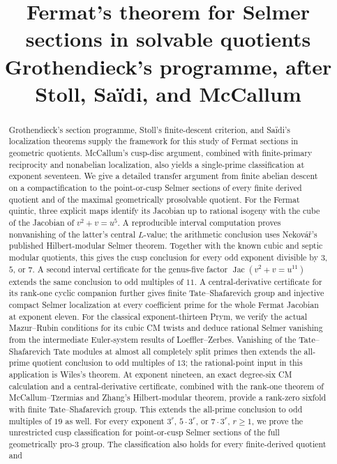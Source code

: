 \documentclass[11pt]{article}
\title{Fermat's theorem for Selmer sections in solvable quotients\\
\large Grothendieck's programme, after Stoll, Sa\"idi, and McCallum}
\author{}
\date{}
\theoremstyle{definition}
\begin{document}
\maketitle
\begin{abstract}
Grothendieck's section programme, Stoll's finite-descent criterion, and
Sa\"idi's localization theorems supply the framework for this study of
Fermat sections in geometric quotients. McCallum's cusp-disc argument,
combined with finite-primary reciprocity and nonabelian localization,
also yields a single-prime classification at exponent seventeen. We give a detailed transfer
argument from finite abelian descent on a compactification to the
point-or-cusp Selmer sections of every finite derived quotient and of the
maximal geometrically prosolvable quotient. For the Fermat quintic, three
explicit maps identify its Jacobian up to rational isogeny with the cube
of the Jacobian of $v^2+v=u^5$. A reproducible interval computation proves
nonvanishing of the latter's central $L$-value; the arithmetic conclusion
uses Nekov\'a\v r's published Hilbert-modular Selmer theorem.
Together with the known cubic and septic modular quotients, this
gives the cusp conclusion for every odd exponent divisible by
$3$, $5$, or $7$.
A second interval certificate for the genus-five factor
$\operatorname{Jac}(v^2+v=u^{11})$ extends the same conclusion to
odd multiples of $11$. A central-derivative certificate for its
rank-one cyclic companion further gives finite Tate--Shafarevich group
and injective compact Selmer localization at every coefficient prime
for the whole Fermat Jacobian at exponent eleven.
For the classical exponent-thirteen Prym,
we verify the actual Mazur--Rubin conditions for its cubic CM twists
and deduce rational Selmer vanishing from the intermediate
Euler-system results of Loeffler--Zerbes. Vanishing of the
Tate--Shafarevich Tate modules at almost all completely split primes
then extends the all-prime quotient conclusion to odd multiples of $13$;
the rational-point input in this application is Wiles's theorem.
At exponent nineteen, an exact degree-six CM calculation and a
central-derivative certificate, combined with the rank-one theorem
of McCallum--Tzermias and Zhang's Hilbert-modular theorem, provide
a rank-zero sixfold with finite Tate--Shafarevich group. This extends
the all-prime conclusion to odd multiples of $19$ as well.
For every exponent $3^r$, $5\cdot3^r$, or $7\cdot3^r$, $r\ge1$, we prove the
unrestricted cusp classification
for point-or-cusp Selmer sections of the full geometrically pro-$3$ group.
The classification also holds for every finite-derived quotient and

\end{abstract}
\end{document}
